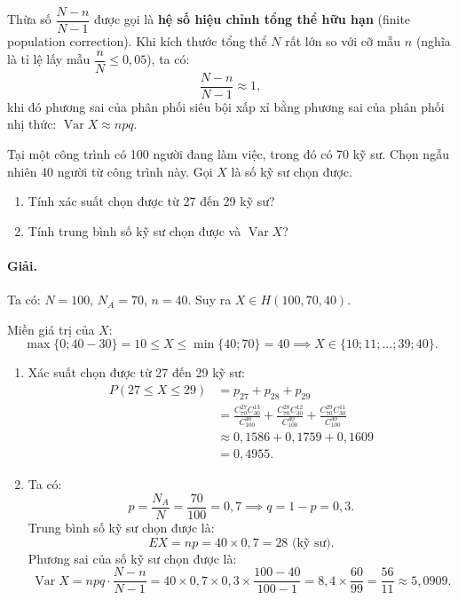 \begin{nhanxet}
Thừa số $\dfrac{N - n}{N - 1}$ được gọi là \textbf{hệ số hiệu chỉnh tổng thể hữu hạn} (finite population correction). Khi kích thước tổng thể $N$ rất lớn so với cỡ mẫu $n$ (nghĩa là tỉ lệ lấy mẫu $\dfrac{n}{N} \le 0{,}05$), ta có:
\[
\frac{N - n}{N - 1} \approx 1,
\]
khi đó phương sai của phân phối siêu bội xấp xỉ bằng phương sai của phân phối nhị thức: $\operatorname{Var} X \approx npq$.
\end{nhanxet}

\begin{vidu}[VD 3]
Tại một công trình có 100 người đang làm việc, trong đó có 70 kỹ sư. Chọn ngẫu nhiên 40 người từ công trình này. Gọi $X$ là số kỹ sư chọn được.
\begin{enumerate}[label=\arabic*)]
    \item Tính xác suất chọn được từ 27 đến 29 kỹ sư?
    \item Tính trung bình số kỹ sư chọn được và $\operatorname{Var} X$?
\end{enumerate}

\paragraph{Giải.}
Ta có: $N = 100$, $N_A = 70$, $n = 40$. Suy ra $X \in H(100, 70, 40)$.

Miền giá trị của $X$:
\[
\max\{0; 40 - 30\} = 10 \le X \le \min\{40; 70\} = 40 \implies X \in \{10; 11; \dots; 39; 40\}.
\]

\begin{enumerate}[label=\arabic*)]
    \item Xác suất chọn được từ 27 đến 29 kỹ sư:
    \begin{align*}
    P(27 \le X \le 29) &= p_{27} + p_{28} + p_{29} \\
    &= \frac{C_{70}^{27} C_{30}^{13}}{C_{100}^{40}} + \frac{C_{70}^{28} C_{30}^{12}}{C_{100}^{40}} + \frac{C_{70}^{29} C_{30}^{11}}{C_{100}^{40}} \\
    &\approx 0{,}1586 + 0{,}1759 + 0{,}1609 \\
    &= 0{,}4955.
    \end{align*}

    \item Ta có:
    \[
    p = \frac{N_A}{N} = \frac{70}{100} = 0{,}7 \implies q = 1 - p = 0{,}3.
    \]
    Trung bình số kỹ sư chọn được là:
    \[
    EX = np = 40 \times 0{,}7 = 28 \text{ (kỹ sư)}.
    \]
    Phương sai của số kỹ sư chọn được là:
    \[
    \operatorname{Var} X = npq \cdot \frac{N - n}{N - 1} = 40 \times 0{,}7 \times 0{,}3 \times \frac{100 - 40}{100 - 1} = 8{,}4 \times \frac{60}{99} = \frac{56}{11} \approx 5{,}0909.
    \]
\end{enumerate}
\end{vidu}

